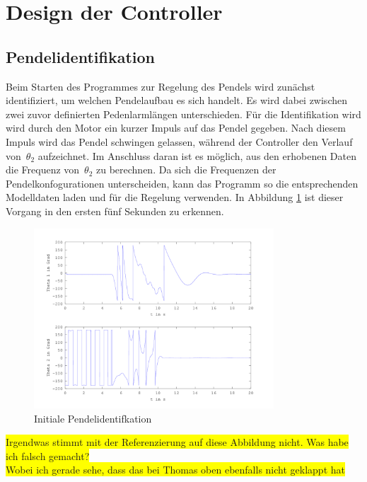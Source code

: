 \section{Design der Controller}
\subsection{Pendelidentifikation}
\label{Pendelidentifikation}
Beim Starten des Programmes zur Regelung des Pendels wird zunächst identifiziert, um welchen Pendelaufbau es sich handelt. Es wird dabei zwischen zwei zuvor definierten Pedenlarmlängen unterschieden.
Für die Identifikation wird wird durch den Motor ein kurzer Impuls auf das Pendel gegeben. Nach diesem Impuls wird das Pendel schwingen gelassen, während der Controller den Verlauf von~$\theta_2$ aufzeichnet. Im Anschluss daran ist es möglich, aus den erhobenen Daten die Frequenz von~$\theta_2$ zu berechnen. Da sich die Frequenzen der Pendelkonfogurationen unterscheiden, kann das Programm so die entsprechenden Modelldaten laden und für die Regelung verwenden. In Abbildung \ref{fig.Identifikation} ist dieser Vorgang in den ersten fünf Sekunden zu erkennen.

\begin{figure}[htbp]
	\centering	
	\label{fig.Identifikation}
	\includegraphics[width=0.8\textwidth]{Grafiken/Swingup_kurz.png}
	\caption{Initiale Pendelidentifkation}
\end{figure}
\colorbox{yellow}{Irgendwas stimmt mit der Referenzierung auf diese Abbildung nicht. Was habe ich falsch gemacht?} \\
\colorbox{yellow}{Wobei ich gerade sehe, dass das bei Thomas oben ebenfalls nicht geklappt hat}



\label{sec.Controller}
